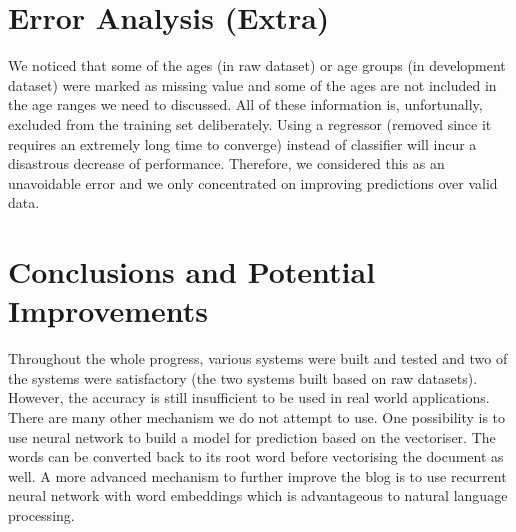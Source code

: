 \documentclass[10pt]{article}
\begin{document}
\section{Error Analysis (Extra)}

We noticed that some of the ages (in raw dataset) or age groups (in development dataset) were marked as missing value and some of the ages are not included in the age ranges we need to discussed. All of these information is, unfortunally, excluded from the training set deliberately. Using a regressor (removed since it requires an extremely long time to converge) instead of classifier will incur a disastrous decrease of performance. Therefore, we considered this as an unavoidable error and we only concentrated on improving predictions over valid data.

\section{Conclusions and Potential Improvements}
\justify

Throughout the whole progress, various systems were built and tested and two of the systems were satisfactory (the two systems built based on raw datasets). However, the accuracy is still insufficient to be used in real world applications. There are many other mechanism we do not attempt to use. One possibility is to use neural network to build a model for prediction based on the vectoriser. The words can be converted back to its root word before vectorising the document as well. A more advanced mechanism to further improve the blog is to use recurrent neural network \cite{rnn} with word embeddings which is advantageous to natural language processing.



\end{document}
